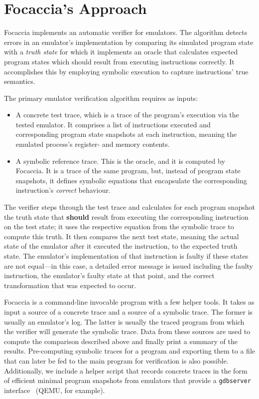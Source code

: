 \section{Focaccia's Approach}

Focaccia implements an automatic verifier for emulators. The algorithm detects errors in an emulator's implementation by
comparing its simulated program state with a \textit{truth state} for which it implements an oracle that calculates
expected program states which should result from executing instructions correctly. It accomplishes this by employing
symbolic execution to capture instructions' true semantics.

The primary emulator verification algorithm requires as inputs:

\begin{itemize}
    \item A concrete test trace, which is a trace of the program's execution via the tested emulator. It comprises a
        list of instructions executed and corresponding program state snapshots at each instruction, meaning the
        emulated process's register- and memory contents.
    \item A symbolic reference trace. This is the oracle, and it is computed by Focaccia. It is a trace of the same
        program, but, instead of program state snapshots, it defines symbolic equations that encapsulate the
        corresponding instruction's \textit{correct} behaviour.
\end{itemize}

The verifier steps through the test trace and calculates for each program snapshot the truth state that \textbf{should}
result from executing the corresponding instruction on the test state; it uses the respective equation from the symbolic
trace to compute this truth. It then compares the next test state, meaning the actual state of the emulator after it
executed the instruction, to the expected truth state. The emulator's implementation of that instruction is faulty if
these states are not equal---in this case, a detailed error message is issued including the faulty instruction, the
emulator's faulty state at that point, and the correct transformation that was expected to occur.

Focaccia is a command-line invocable program with a few helper tools. It takes as input a source of a concrete trace and
a source of a symbolic trace. The former is usually an emulator's log. The latter is usually the traced program from
which the verifier will generate the symbolic trace. Data from these sources are used to compute the comparison
described above and finally print a summary of the results. Pre-computing symbolic traces for a program and exporting
them to a file that can later be fed to the main program for verification is also possible. Additionally, we include a
helper script that records concrete traces in the form of efficient minimal program snapshots from emulators that
provide a \texttt{gdbserver} interface~\cite{Sourceware2024GdbRemoteProtocol} (QEMU, for example).


